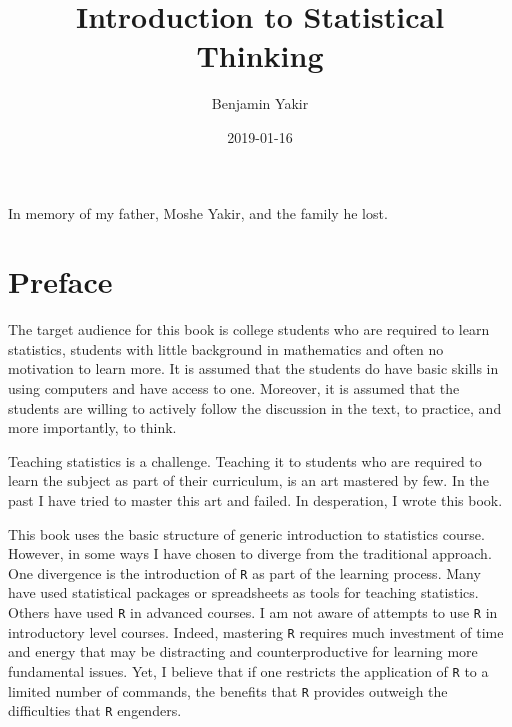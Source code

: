 \documentclass[]{krantz}
\title{Introduction to Statistical Thinking}
\author{Benjamin Yakir}
\date{2019-01-16}
\theoremstyle{definition}
\theoremstyle{definition}
\theoremstyle{definition}
\theoremstyle{remark}
\begin{document}
\maketitle


\thispagestyle{empty}

\begin{center}
In memory of my father, Moshe Yakir, and the family he lost.
\end{center}

\setlength{\abovedisplayskip}{-5pt}
\setlength{\abovedisplayshortskip}{-5pt}

{
\hypersetup{linkcolor=}
\setcounter{tocdepth}{2}
\tableofcontents
}
\hypertarget{preface}{%
\chapter*{Preface}\label{preface}}


The target audience for this book is college students who are required
to learn statistics, students with little background in mathematics and
often no motivation to learn more. It is assumed that the students do
have basic skills in using computers and have access to one. Moreover,
it is assumed that the students are willing to actively follow the
discussion in the text, to practice, and more importantly, to think.

Teaching statistics is a challenge. Teaching it to students who are
required to learn the subject as part of their curriculum, is an art
mastered by few. In the past I have tried to master this art and failed.
In desperation, I wrote this book.

This book uses the basic structure of generic introduction to statistics
course. However, in some ways I have chosen to diverge from the
traditional approach. One divergence is the introduction of \texttt{R} as part
of the learning process. Many have used statistical packages or
spreadsheets as tools for teaching statistics. Others have used \texttt{R} in
advanced courses. I am not aware of attempts to use \texttt{R} in introductory
level courses. Indeed, mastering \texttt{R} requires much investment of time
and energy that may be distracting and counterproductive for learning
more fundamental issues. Yet, I believe that if one restricts the
application of \texttt{R} to a limited number of commands, the benefits that
\texttt{R} provides outweigh the difficulties that \texttt{R} engenders.
\end{document}

